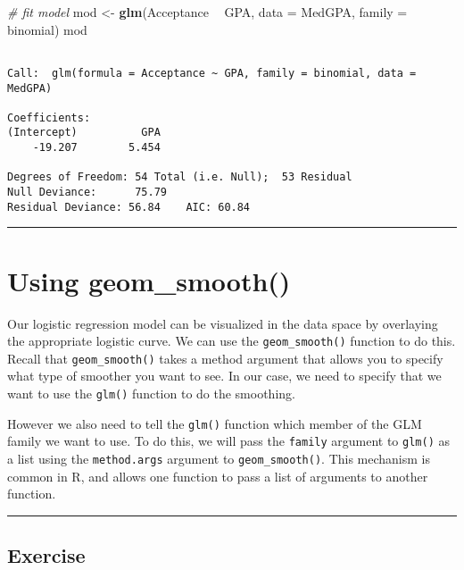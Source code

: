 \documentclass[]{book}
\newenvironment{Shaded}{\begin{snugshade}}{\end{snugshade}}
\newcommand{\KeywordTok}[1]{\textcolor[rgb]{0.13,0.29,0.53}{\textbf{#1}}}
\newcommand{\DataTypeTok}[1]{\textcolor[rgb]{0.13,0.29,0.53}{#1}}
\newcommand{\StringTok}[1]{\textcolor[rgb]{0.31,0.60,0.02}{#1}}
\newcommand{\CommentTok}[1]{\textcolor[rgb]{0.56,0.35,0.01}{\textit{#1}}}
\newcommand{\OperatorTok}[1]{\textcolor[rgb]{0.81,0.36,0.00}{\textbf{#1}}}
\newcommand{\NormalTok}[1]{#1}
\begin{document}
\begin{Shaded}
\begin{Highlighting}[]
\CommentTok{# fit model}
\NormalTok{mod <-}\StringTok{ }\KeywordTok{glm}\NormalTok{(Acceptance }\OperatorTok{~}\StringTok{ }\NormalTok{GPA, }\DataTypeTok{data =}\NormalTok{ MedGPA, }\DataTypeTok{family =}\NormalTok{ binomial)}
\NormalTok{mod}
\end{Highlighting}
\end{Shaded}

\begin{verbatim}

Call:  glm(formula = Acceptance ~ GPA, family = binomial, data = MedGPA)

Coefficients:
(Intercept)          GPA  
    -19.207        5.454  

Degrees of Freedom: 54 Total (i.e. Null);  53 Residual
Null Deviance:      75.79 
Residual Deviance: 56.84    AIC: 60.84
\end{verbatim}

\begin{center}\rule{0.5\linewidth}{\linethickness}\end{center}

\section{Using geom\_smooth()}\label{using-geom_smooth}

Our logistic regression model can be visualized in the data space by
overlaying the appropriate logistic curve. We can use the
\texttt{geom\_smooth()} function to do this. Recall that
\texttt{geom\_smooth()} takes a method argument that allows you to
specify what type of smoother you want to see. In our case, we need to
specify that we want to use the \texttt{glm()} function to do the
smoothing.

However we also need to tell the \texttt{glm()} function which member of
the GLM family we want to use. To do this, we will pass the
\texttt{family} argument to \texttt{glm()} as a list using the
\texttt{method.args} argument to \texttt{geom\_smooth()}. This mechanism
is common in R, and allows one function to pass a list of arguments to
another function.

\begin{center}\rule{0.5\linewidth}{\linethickness}\end{center}

\subsection*{Exercise}\label{exercise-15}
\end{document}
